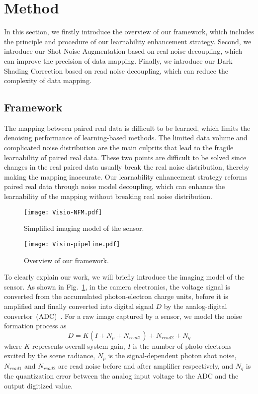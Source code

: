 \documentclass[sigconf,screen,nonacm]{acmart}
\begin{document}
\section{Method}\label{Methods}
    In this section, we firstly introduce the overview of our framework, which includes the principle and procedure of our learnability enhancement strategy. Second, we introduce our Shot Noise Augmentation based on real noise decoupling, which can improve the precision of data mapping. Finally, we introduce our Dark Shading Correction based on read noise decoupling, which can reduce the complexity of data mapping.


\subsection{Framework}
\label{Framework}
The mapping between paired real data is difficult to be learned, which limits the denoising performance of learning-based methods. 
The limited data volume and complicated noise distribution are the main culprits that lead to the fragile learnability of paired real data.
These two points are difficult to be solved since changes in the real paired data usually break the real noise distribution, thereby making the mapping inaccurate.
Our learnability enhancement strategy reforms paired real data through noise model decoupling, which can enhance the learnability of the mapping without breaking real noise distribution.

\begin{figure}[t!]
    \begin{center}
      \texttt{[image: Visio-NFM.pdf]}
    \end{center}
    \caption{Simplified imaging model of the sensor.}
    \label{fig:Formation}
\end{figure}
\begin{figure*}[t!]
    \begin{center}
      \texttt{[image: Visio-pipeline.pdf]}
    \end{center}
    \caption{Overview of our framework.}
    \label{fig:framework}
\end{figure*}

To clearly explain our work, we will briefly introduce the imaging model of the sensor.
As shown in Fig.~\ref{fig:Formation}, in the camera electronics, the voltage signal is converted from the accumulated photon-electron charge units, before it is amplified and finally converted into digital signal $D$ by the analog-digital convertor~(ADC)~\cite{EMVA1288}.
For a raw image captured by a sensor, we model the noise formation process as
\begin{equation}\label{eq:raw}
    D = K(I + N_p + N_{read1}) + N_{read2} + N_q
\end{equation}
where $K$ represents overall system gain, $I$ is the number of photo-electrons excited by the scene radiance, $N_p$ is the signal-dependent photon shot noise, $N_{read1}$ and $N_{read2}$ are read noise before and after amplifier respectively, and $N_q$ is the quantization error between the analog input voltage to the ADC and the output digitized value.
\end{document}
